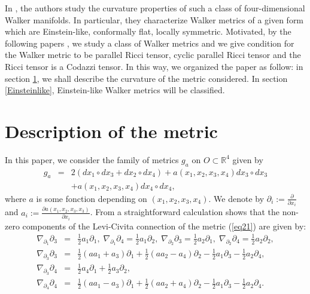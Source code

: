 \documentclass[reqno, 12pt]{amsart}
\numberwithin{equation}{section}
\begin{document}
\noindent
In \cite{Batat2009}, the authors study the curvature properties of such 
a class of four-dimensional Walker manifolds. In particular, they characterize Walker metrics of a given form which are Einstein-like, conformally flat, locally symmetric. Motivated, by the following papers
\cite{Batat2009, Calvaruso2007}, 
we study a class of Walker metrics and we give condition for the Walker metric to be parallel Ricci tensor,  cyclic parallel Ricci tensor and the Ricci tensor is a Codazzi tensor. In this way, we organized 
the paper as follow:  in section \ref{Description}, we shall describe the curvature of the metric considered. In section \ref{Einsteinlike}, 
Einstein-like Walker metrics will be classified.



\section{Description of the metric}\label{Description}

\noindent
In this paper, we consider the family of metrics $g_{a}$ on
$O\subset \mathbb{R}^4$ given by
\begin{eqnarray}\label{eq21} 
g_{a} & = & 2(dx_1\circ dx_3 + dx_2 \circ dx_4 ) 
+ a(x_1,x_2,x_3,x_4)dx_3\circ dx_3\nonumber\\
&& + a(x_1,x_2,x_3,x_4)dx_4 \circ dx_4 ,
\end{eqnarray}
where $a$ is some fonction depending on $(x_1,x_2,x_3, x_4)$. We 
denote by 
$\partial_i := \frac{\partial}{\partial x_i}$ and
$a_i := \frac{\partial a(x_1, x_2, x_3, x_3)}{\partial x_i}$. 
From a straightforward calculation shows that the non-zero components  of the Levi-Civita connection of the metric (\ref{eq21}) are given by:
\begin{eqnarray}\label{eq22}
\nabla_{\partial_1}\partial_3 &=& \frac{1}{2}a_1\partial_1 , \; \nabla_{\partial_1}\partial_4 = \frac{1}{2}a_1\partial_2 , \;
\nabla_{\partial_2}\partial_3 = \frac{1}{2}a_2\partial_1 , \;\nabla_{\partial_2}\partial_4 = \frac{1}{2}a_2\partial_2 , \nonumber \\
\nabla_{\partial_3}\partial_3 &=& \frac{1}{2}(aa_1 + a_3)\partial_1
+ \frac{1}{2}(aa_2 - a_4)\partial_2 - \frac{1}{2}a_1\partial_3
- \frac{1}{2}a_2\partial_4 , \nonumber \\
\nabla_{\partial_3}\partial_4 &=& \frac{1}{2}a_4\partial_1
+ \frac{1}{2}a_3\partial_2 ,\nonumber\\
\nabla_{\partial_4}\partial_4 &=& \frac{1}{2}(aa_1 - a_3)\partial_1
+ \frac{1}{2}(aa_2 + a_4)\partial_2 - \frac{1}{2}a_1\partial_3
- \frac{1}{2}a_2\partial_4 .
\end{eqnarray}   
\end{document}

